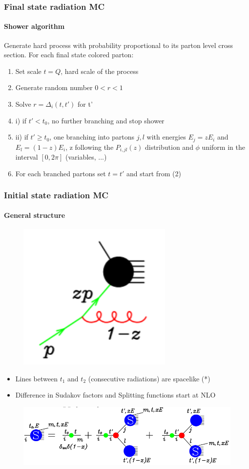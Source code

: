 \documentclass[aspectratio=43]{beamer}
\begin{document}
\begin{frame}

	\frametitle{Final state radiation MC}
	\framesubtitle{Shower algorithm}
	
	\footnotesize Generate hard process with probability proportional to its parton level cross section. For each final state colored parton:
	\begin{enumerate} 
		\item \footnotesize Set scale $t = Q$, hard scale of the process
		\item \footnotesize Generate random number $0 < r < 1$
		\item \footnotesize Solve $r = \Delta_{i}(t, t')$ for t'
		\item \footnotesize i) if $t' < t_{0}$, no further branching and stop shower
		\item \footnotesize ii) if $t' \geq t_{0}$, one branching into partons $j, l$ with energies $E_{j} = zE_{i}$ and $E_{l} = (1 - z)E_{i}$, z following the $P_{i, jl}(z)$ distribution and $\phi$ uniform in the interval $[0, 2\pi]$ (variables, ...)
		\item \footnotesize For each branched partons set $t = t'$ and start from (2)
	\end{enumerate}

\end{frame}

\begin{frame}

	\frametitle{Initial state radiation MC}
	\framesubtitle{General structure}
	
	\begin{figure}
		\includegraphics[width = 2 cm]{plots/shower_ISR_0.png}
	\end{figure}
	
	\begin{itemize} 
		\item \footnotesize Lines between $t_{1}$ and $t_{2}$ (consecutive radiations) are spacelike {\color{blue}(*)}
		\item \footnotesize Difference in Sudakov factors and Splitting functions start at NLO
	\end{itemize}
	
	\begin{figure}
		\includegraphics[width = 10 cm]{plots/shower_ISR_3.png}
	\end{figure}

\end{frame}
\end{document}
